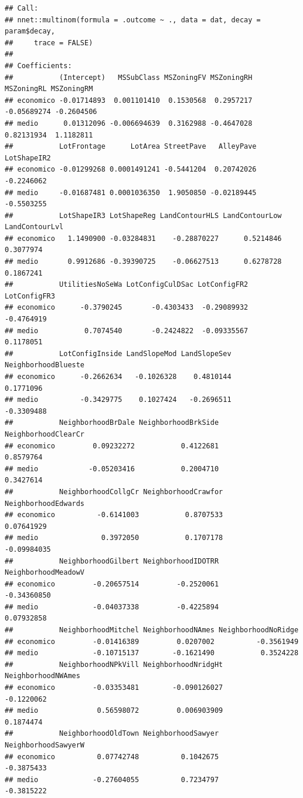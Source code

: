 \documentclass[
]{article}
\begin{document}
\begin{verbatim}
## Call:
## nnet::multinom(formula = .outcome ~ ., data = dat, decay = param$decay, 
##     trace = FALSE)
## 
## Coefficients:
##           (Intercept)   MSSubClass MSZoningFV MSZoningRH  MSZoningRL MSZoningRM
## economico -0.01714893  0.001101410  0.1530568  0.2957217 -0.05689274 -0.2604506
## medio      0.01312096 -0.006694639  0.3162988 -0.4647028  0.82131934  1.1182811
##           LotFrontage      LotArea StreetPave   AlleyPave LotShapeIR2
## economico -0.01299268 0.0001491241 -0.5441204  0.20742026  -0.2246062
## medio     -0.01687481 0.0001036350  1.9050850 -0.02189445  -0.5503255
##           LotShapeIR3 LotShapeReg LandContourHLS LandContourLow LandContourLvl
## economico   1.1490900 -0.03284831    -0.28870227      0.5214846      0.3077974
## medio       0.9912686 -0.39390725    -0.06627513      0.6278728      0.1867241
##           UtilitiesNoSeWa LotConfigCulDSac LotConfigFR2 LotConfigFR3
## economico      -0.3790245       -0.4303433  -0.29089932   -0.4764919
## medio           0.7074540       -0.2424822  -0.09335567    0.1178051
##           LotConfigInside LandSlopeMod LandSlopeSev NeighborhoodBlueste
## economico      -0.2662634   -0.1026328    0.4810144           0.1771096
## medio          -0.3429775    0.1027424   -0.2696511          -0.3309488
##           NeighborhoodBrDale NeighborhoodBrkSide NeighborhoodClearCr
## economico         0.09232272           0.4122681           0.8579764
## medio            -0.05203416           0.2004710           0.3427614
##           NeighborhoodCollgCr NeighborhoodCrawfor NeighborhoodEdwards
## economico          -0.6141003           0.8707533          0.07641929
## medio               0.3972050           0.1707178         -0.09984035
##           NeighborhoodGilbert NeighborhoodIDOTRR NeighborhoodMeadowV
## economico         -0.20657514         -0.2520061         -0.34360850
## medio             -0.04037338         -0.4225894          0.07932858
##           NeighborhoodMitchel NeighborhoodNAmes NeighborhoodNoRidge
## economico         -0.01416389         0.0207002          -0.3561949
## medio             -0.10715137        -0.1621490           0.3524228
##           NeighborhoodNPkVill NeighborhoodNridgHt NeighborhoodNWAmes
## economico         -0.03353481        -0.090126027         -0.1220062
## medio              0.56598072         0.006903909          0.1874474
##           NeighborhoodOldTown NeighborhoodSawyer NeighborhoodSawyerW
## economico          0.07742748          0.1042675          -0.3875433
## medio             -0.27604055          0.7234797          -0.3815222

\end{verbatim}
\end{document}
